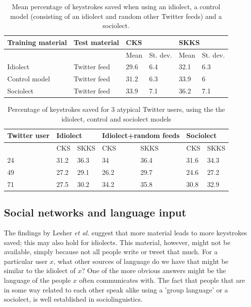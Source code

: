 \documentclass[11pt]{article}
\begin{document}
{\begin{table}[htb] 
\centering
\begin{tabular}{ll|llll} 
Training material&Test material&\multicolumn{2}{l}{CKS}&\multicolumn{2}{l}{SKKS}\\
\hline
&&Mean&St. dev.&Mean&St. dev.\\
Idiolect&Twitter feed&29.6&6.4&32.1&6.3\\
Control model&Twitter feed&31.2&6.3&33.9&6\\
Sociolect&Twitter feed&33.9&7.1&36.2&7.1\\
\end{tabular} 
\caption{Mean percentage of keystrokes saved when using an idiolect, a control model (consisting of an idiolect and random other Twitter feeds) and a sociolect.} \label{socio_results}
\end{table}

\begin{table}[htb] 
\centering
\begin{tabular}{l|llllll} 
Twitter user&\multicolumn{2}{l}{Idiolect}&\multicolumn{2}{l}{Idiolect+random feeds}&\multicolumn{2}{l}{Sociolect}\\
\hline
&CKS&SKKS&CKS&SKKS&CKS&SKKS\\
24&31.2&36.3&34&36.4&31.6&34.3\\
49&27.2&29.1&26.2&29.7&24.6&27.2\\
71&27.5&30.2&34.2&35.8&30.8&32.9\\
\end{tabular} 
\caption{Percentage of keystrokes saved for 3 atypical Twitter users, using the the idiolect, control and sociolect models}
\label{deviations}
\end{table}

\subsection{Social networks and language input} \label{input_networks}

The findings by Lesher {\em et al.}  suggest that more material leads to more keystrokes saved; this may also hold for idiolects. This material, however, might not be available, simply because not all people write or tweet that much. For a particular user $x$, what other sources of language do we have that might be similar to the idiolect of $x$? One of the more obvious answers might be the language of the people $x$ often communicates with. The fact that people that are in some way related to each other speak alike using a 'group language' or a sociolect, is well established in sociolinguistics.

}
\end{document}
